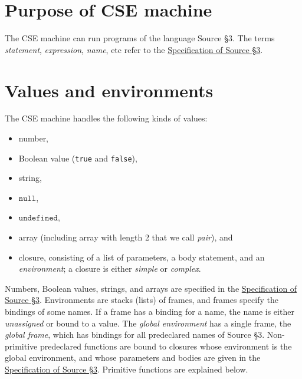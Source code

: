 



\section{Purpose of CSE machine}

The CSE machine can run programs of the language Source \S 3.
The terms \emph{statement}, \emph{expression},
\emph{name}, etc refer to the 
\href{https://docs.sourceacademy.org/source_3.pdf}{\color{blue}Specification of Source \S 3}.

\section{Values and environments}

The CSE machine handles the following kinds of values:
\begin{itemize}
\item number,
\item Boolean value (\lstinline{true} and \lstinline{false}),
\item string,
\item $\texttt{null}$,
\item $\texttt{undefined}$,
\item array (including array with length 2 that we call \emph{pair}), and
\item closure, consisting of a list of parameters, a body statement, and an \emph{environment};
a closure is either \emph{simple} or \emph{complex}.
\end{itemize}
Numbers, Boolean values, strings, and arrays are specified in the
\href{https://docs.sourceacademy.org/source_3.pdf}{\color{blue}Specification of Source \S 3}.
Environments are stacks (lists) of frames, and frames specify the bindings of some names.
If a frame has a binding for a name, the name is either \emph{unassigned} or
bound to a value.
The \emph{global environment} has a single frame, the \emph{global frame}, which has
bindings for all predeclared names of Source \S 3.
Non-primitive predeclared functions are bound to closures whose environment is the global environment,
and whose parameters and bodies are given in the
\href{https://docs.sourceacademy.org/source_3.pdf}{\color{blue}Specification of Source \S 3}.
Primitive functions are explained below.

